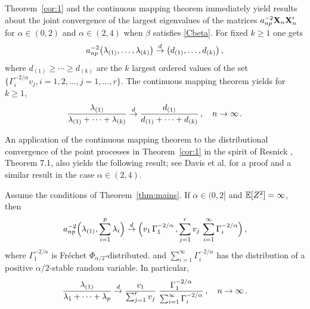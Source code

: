 \par
Theorem~\ref{cor:1} and the continuous mapping theorem immediately yield results about
the joint convergence of the largest eigenvalues of the matrices $a_{np}^{-2}{\mathbf X}_n{\mathbf X}_n'$ for $\alpha\in (0,2)$ and
$\alpha\in (2,4)$ when $\beta$ satisfies \ref{Cbeta}.
For fixed $k\ge 1$ one gets
\begin{equation*}
a_{np}^{-2} \big(\lambda_{(1)},\ldots,\lambda_{(k)}\big)\stackrel{d}{\rightarrow}
\big(d_{(1)},\ldots, d_{(k)}\big)\,,
\end{equation*}
where $d_{(1)}\ge \cdots\ge d_{(k)}$ are the $k$ largest ordered
values of the set $\{\Gamma_i^{-2/\alpha} v_j, i=1,2,\ldots,j=1,\ldots,r\}$.
The continuous mapping theorem yields for $k\ge 1$,
\begin{equation}\label{eq:u}
\dfrac{\lambda_{(1)}}{\lambda_{(1)}+\cdots+ \lambda_{(k)}}\stackrel{d}{\rightarrow}
\dfrac{d_{(1)}}{d_{(1)}+\cdots+ d_{(k)}}\,,\quad n \to \infty\,.
\end{equation}

An application of the continuous mapping theorem to  the distributional convergence of the point processes in Theorem~\ref{cor:1} in the spirit of Resnick
\cite{resnick:2007}, Theorem 7.1, also yields the following result; see Davis et al. \cite{davis:mikosch:pfaffel:2016} for a proof and a similar result in the case $\alpha \in (2,4)$.
\begin{corollary}\label{cor:1q} Assume the conditions of Theorem~\ref{thm:mains}.
If $\alpha \in (0,2]$ and $\mathbb{E}[Z^2]=\infty$, then
\begin{equation*}
a_{np}^{-2}\Big(\lambda_{(1)},\sum_{i=1}^p \lambda_i\Big) \stackrel{d}{\rightarrow}
\Big( v_1\,\Gamma_1^{-2/\alpha}\,,\sum_{j=1}^r v_j\,\sum_{i=1}^\infty \Gamma_i^{-2/\alpha}\Big)\,,
\end{equation*}
where $\Gamma_1^{-2/\alpha}$ is Fr\'echet $\Phi_{\alpha/2}$-distributed.
and $\sum_{i=1}^\infty \Gamma_i^{-2/\alpha}$ has the distribution
of a positive $\alpha/2$-stable random variable.
In particular,
\begin{equation}\label{eq:limit}
\dfrac{\lambda_{(1)}}{\lambda_{1}+\cdots+ \lambda_{p}}\stackrel{d}{\rightarrow}
\dfrac{v_1}{\sum_{j=1}^r v_j}\;
\dfrac{\Gamma_1^{-2/\alpha}}{\sum_{i=1}^\infty\Gamma_i^{-2/\alpha}}\,,\quad
n \to \infty\,.
\end{equation}
\end{corollary}

